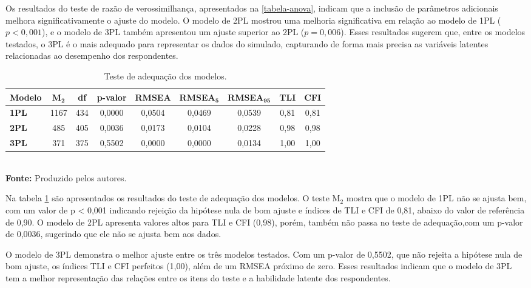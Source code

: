 Os resultados do teste de razão de verossimilhança, apresentados na \ref{tabela-anova}, indicam que a inclusão de parâmetros adicionais melhora significativamente o ajuste do modelo. O modelo de 2PL mostrou uma melhoria significativa em relação ao modelo de 1PL ($p < 0,001$), e o modelo de 3PL também apresentou um ajuste superior ao 2PL ($p = 0,006$). Esses resultados sugerem que, entre os modelos testados, o 3PL é o mais adequado para representar os dados do simulado, capturando de forma mais precisa as variáveis latentes relacionadas ao desempenho dos respondentes.

\begin{table}[!htb]
	 \centering
		\caption{Teste de adequação dos modelos. }
		\label{tabela-m2}
		\begin{tabular}{lcccccccc}
			\hline
			\textbf{Modelo} & \textbf{M}$_\textbf{2}$ & \textbf{df} &\textbf{ p-valor} & \textbf{RMSEA} & \textbf{RMSEA$_\textbf{5}$} & \textbf{RMSEA$_{\textbf{95}}$} & \textbf{TLI} & \textbf{CFI} \\ 
			\hline 
		\textbf{1PL} & 1167 & 434 & 0,0000 & 0,0504 & 0,0469 & 0,0539 & 0,81 & 0,81 \\ 
		\hline
		\textbf{2PL} & 485 & 405 & 0,0036 & 0,0173 & 0,0104 & 0,0228 & 0,98 & 0,98 \\ 
		\hline
		\textbf{3PL} & 371 & 375 & 0,5502 & 0,0000 & 0,0000 & 0,0134 & 1,00 & 1,00 \\ 
			\hline
		\end{tabular}\\
		\vspace*{0.5cm}
		\small{\textbf{Fonte:} Produzido pelos autores.}
\end{table}


Na tabela \ref{tabela-m2} são apresentados os resultados do teste de adequação dos modelos. O teste M$_2$ mostra que o modelo de 1PL não se ajusta bem, com um valor de p < 0,001 indicando rejeição da hipótese nula de bom ajuste e índices de TLI e CFI de 0,81, abaixo do valor de referência de 0,90. O modelo de 2PL apresenta valores altos para TLI e CFI (0,98), porém, também não passa no teste de adequação,com um p-valor de 0,0036, sugerindo que ele não se ajusta bem aos dados.

O modelo de 3PL demonstra o melhor ajuste entre os três modelos testados. Com um p-valor de 0,5502, que não rejeita a hipótese nula de bom ajuste, os índices TLI e CFI perfeitos (1,00), além de um RMSEA próximo de zero. Esses resultados indicam que o modelo de 3PL tem a melhor representação das relações entre os itens do teste e a habilidade latente dos respondentes.


